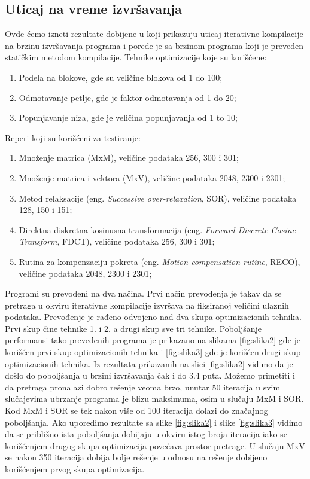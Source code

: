\documentclass[a4paper]{article}
\begin{document}
\subsection{Uticaj na vreme izvršavanja}
\label{sec:uticaj}
  Ovde ćemo izneti rezultate dobijene u \cite{kisuki2000iterative} koji prikazuju uticaj iterativne kompilacije 
 na brzinu izvršavanja programa i porede je sa brzinom programa koji je preveden statičkim metodom kompilacije.
\newline Tehnike optimizacije koje su korišćene:
\begin{enumerate}
\item Podela na blokove, gde su veličine blokova od 1 do 100;
\item Odmotavanje petlje, gde je faktor odmotavanja od 1 do 20;
\item Popunjavanje niza, gde je veličina popunjavanja od 1 to 10;
\end{enumerate}
Reperi koji su korišćeni za testiranje:
\begin{enumerate}
\item Množenje matrica (MxM), veličine podataka 256, 300 i 301;
\item Množenje matrica i vektora (MxV), veličine podataka 2048, 2300 i 2301;
\item Metod relaksacije (eng. \emph{Successive over-relaxation}, SOR), veličine podataka 128, 150 i 151;
\item Direktna diskretna kosinusna transformacija (eng. \emph{Forward Discrete Cosine Transform}, FDCT), veličine podataka 256, 300 i 301;
\item Rutina za kompenzaciju pokreta (eng. \emph{Motion compensation rutine}, RECO), veličine podataka 2048, 2300 i 2301;
\end{enumerate}
Programi su prevođeni na dva načina.
Prvi način prevođenja je takav da se pretraga u okviru iterativne kompilacije izvršava na 
fiksiranoj veličini ulaznih podataka. Prevođenje je rađeno odvojeno nad dva skupa
optimizacionih tehnika. Prvi skup čine tehnike 1. i 2. a drugi skup sve tri tehnike. Poboljšanje performansi 
tako prevedenih programa je prikazano na slikama \ref{fig:slika2} gde je korišćen prvi skup optimizacionih tehnika i 
\ref{fig:slika3} gde je korišćen drugi skup optimizacionih tehnika. Iz rezultata prikazanih na slici \ref{fig:slika2} vidimo da
je došlo do poboljšanja u brzini izvršavanja čak i do 3.4 puta. Možemo primetiti i da pretraga pronalazi 
dobro rešenje veoma brzo, unutar 50 iteracija u svim slučajevima ubrzanje programa je blizu maksimuma, osim
 u slučaju MxM i SOR. Kod MxM i SOR se tek nakon više od 100 iteracija dolazi do značajnog poboljšanja.
Ako uporedimo rezultate sa slike \ref{fig:slika2} i slike \ref{fig:slika3} vidimo da se približno ista poboljšanja
 dobijaju u okviru istog broja iteracija iako se korišćenjem drugog skupa optimizacija povećava prostor 
pretrage. U slučaju MxV se nakon 350 iteracija dobija bolje rešenje u odnosu na rešenje dobijeno korišćenjem prvog skupa 
optimizacija.
\end{document}
